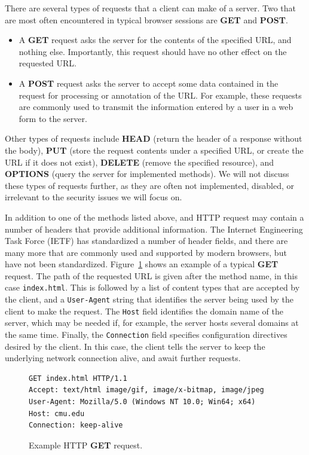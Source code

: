\documentclass[11pt,twoside]{scrartcl}
\begin{document}
There are several types of requests that a client can make of a server.
Two that are most often encountered in typical browser sessions are \textbf{GET} and \textbf{POST}.
\begin{itemize}
\item A \textbf{GET} request asks the server for the contents of the specified URL, and nothing else. Importantly, this request should have no other effect on the requested URL.
\item A \textbf{POST} request asks the server to accept some data contained in the request for processing or annotation of the URL. For example, these requests are commonly used to transmit the information entered by a user in a web form to the server.
\end{itemize}
Other types of requests include \textbf{HEAD} (return the header of a response without the body), \textbf{PUT} (store the request contents under a specified URL, or create the URL if it does not exist), \textbf{DELETE} (remove the specified resource), and \textbf{OPTIONS} (query the server for implemented methods).
We will not discuss these types of requests further, as they are often not implemented, disabled, or irrelevant to the security issues we will focus on.

In addition to one of the methods listed above, and HTTP request may contain a number of headers that provide additional information.
The Internet Engineering Task Force (IETF) has standardized a number of header fields, and there are many more that are commonly used and supported by modern browsers, but have not been standardized.
Figure~\ref{fig:get-example} shows an example of a typical \textbf{GET} request.
The path of the requested URL is given after the method name, in this case \verb'index.html'.
This is followed by a list of content types that are accepted by the client, and a \verb'User-Agent' string that identifies the server being used by the client to make the request.
The \verb'Host' field identifies the domain name of the server, which may be needed if, for example, the server hosts several domains at the same time.
Finally, the \verb'Connection' field specifies configuration directives desired by the client.
In this case, the client tells the server to keep the underlying network connection alive, and await further requests.

\begin{figure}
\begin{lstlisting}
GET index.html HTTP/1.1
Accept: text/html image/gif, image/x-bitmap, image/jpeg
User-Agent: Mozilla/5.0 (Windows NT 10.0; Win64; x64)
Host: cmu.edu
Connection: keep-alive
\end{lstlisting}
\caption{Example HTTP \textbf{GET} request.}
\label{fig:get-example}
\end{figure}
\end{document}
